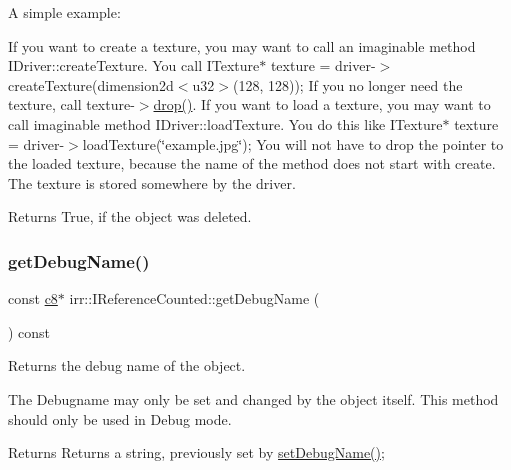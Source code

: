A simple example\+:

If you want to create a texture, you may want to call an imaginable method I\+Driver\+::create\+Texture. You call I\+Texture$\ast$ texture = driver-\/$>$create\+Texture(dimension2d$<$u32$>$(128, 128)); If you no longer need the texture, call texture-\/$>$\hyperlink{classirr_1_1IReferenceCounted_a03856a09355b89d178090c4a5f738543}{drop()}. If you want to load a texture, you may want to call imaginable method I\+Driver\+::load\+Texture. You do this like I\+Texture$\ast$ texture = driver-\/$>$load\+Texture(\char`\"{}example.\+jpg\char`\"{}); You will not have to drop the pointer to the loaded texture, because the name of the method does not start with \textquotesingle{}create\textquotesingle{}. The texture is stored somewhere by the driver. \begin{DoxyReturn}{Returns}
True, if the object was deleted. 
\end{DoxyReturn}
\mbox{\label{classirr_1_1IReferenceCounted_ad336c6e3c975e4c7911a606c27b894f0}} 
\subsubsection{\texorpdfstring{get\+Debug\+Name()}{getDebugName()}}
{\footnotesize\ttfamily const \hyperlink{namespaceirr_a9395eaea339bcb546b319e9c96bf7410}{c8}$\ast$ irr\+::\+I\+Reference\+Counted\+::get\+Debug\+Name (\begin{DoxyParamCaption}{ }\end{DoxyParamCaption}) const\hspace{0.3cm}{\ttfamily [inline]}}



Returns the debug name of the object. 

The Debugname may only be set and changed by the object itself. This method should only be used in Debug mode. \begin{DoxyReturn}{Returns}
Returns a string, previously set by \hyperlink{classirr_1_1IReferenceCounted_a704c5042d399fe8cd3bdd65a0559002a}{set\+Debug\+Name()}; 
\end{DoxyReturn}
\mbox{\label{classirr_1_1IReferenceCounted_ae9836f102c33c68068e74292e0a01819}} 
